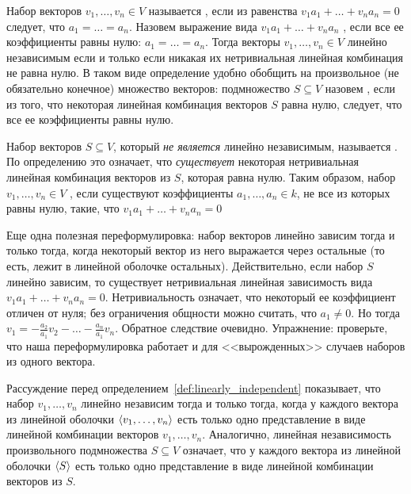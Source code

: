 \begin{definition}\label{def:linearly_independent}
Набор векторов $v_1,\dots,v_n\in V$ называется ,
если из равенства $v_1a_1 + \dots + v_na_n = 0$ следует, что
$a_1 = \dots = a_n$. Назовем выражение вида
$v_1a_1 + \dots + v_na_n$ ,
если все ее коэффициенты равны нулю: $a_1 = \dots = a_n$.
Тогда векторы $v_1,\dots,v_n\in V$ линейно независимым если и только если
никакая их нетривиальная линейная комбинация не равна нулю.
В таком виде определение удобно обобщить на произвольное (не обязательно
конечное) множество векторов: подмножество $S\subseteq V$ назовем
, если из того, что некоторая линейная комбинация
векторов $S$ равна нулю, следует, что все ее коэффициенты равны нулю.
\end{definition}

\begin{definition}
Набор векторов $S\subseteq V$, который {\em не является} линейно независимым,
называется . По определению это означает,
что {\em существует} некоторая нетривиальная линейная комбинация
векторов из $S$, которая равна нулю. Таким образом,
набор $v_1,\dots,v_n\in V$ , если существуют
коэффициенты $a_1,\dots,a_n\in k$, не все из которых равны нулю, такие,
что $v_1a_1 + \dots + v_na_n = 0$
\end{definition}

\begin{remark}
Еще одна полезная переформулировка: набор векторов линейно зависим тогда и только тогда,
когда некоторый вектор из него выражается через остальные (то есть,
лежит в линейной оболочке остальных). Действительно,
если набор $S$ линейно зависим, то существует нетривиальная линейная зависимость
вида $v_1a_1 + \dots + v_na_n = 0$. Нетривиальность означает, что некоторый
ее коэффициент отличен от нуля; без ограничения общности можно считать,
что $a_1\neq 0$. Но тогда $v_1 = -\frac{a_2}{a_1}v_2 - \dots - \frac{a_n}{a_1}v_n$.
Обратное следствие очевидно. Упражнение: проверьте,
что наша переформулировка работает и для <<вырожденных>> случаев
наборов из одного вектора.
\end{remark}

\begin{remark}
Рассуждение перед определением~\ref{def:linearly_independent} показывает,
что набор $v_1,\dots,v_n$ линейно независим тогда и только тогда,
когда у каждого вектора из линейной оболочки $\langle v_1,\dots,v_n\rangle$ есть
только одно представление в виде линейной комбинации векторов
$v_1,\dots,v_n$. Аналогично, линейная независимость
произвольного подмножества $S\subseteq V$ означает, что
у каждого вектора из линейной оболочки $\langle S\rangle$ есть только
одно представление в виде линейной комбинации векторов из $S$.
\end{remark}

